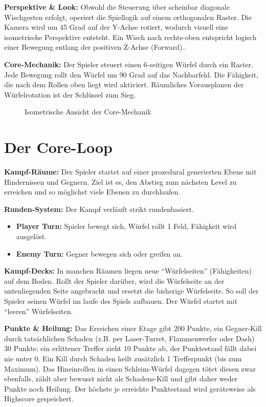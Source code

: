 \documentclass[oneside]{ausarbeitung}
\begin{document}
\textbf{Perspektive \& Look:} Obwohl die Steuerung über scheinbar diagonale Wischgesten erfolgt, operiert die Spiellogik auf einem orthogonalen Raster. Die Kamera wird um 45 Grad auf der Y-Achse rotiert, wodurch visuell eine isometrische Perspektive entsteht. Ein Wisch nach rechts-oben entspricht logisch einer Bewegung entlang der positiven Z-Achse (Forward)..

\textbf{Core-Mechanik:} Der Spieler steuert einen 6-seitigen Würfel durch ein Raster. Jede Bewegung rollt den Würfel um 90 Grad auf das Nachbarfeld. Die Fähigkeit, die nach dem Rollen oben liegt wird aktiviert. Räumliches Vorausplanen der Würfelrotation ist der Schlüssel zum Sieg.

\begin{figure}[h]
    \centering
    \caption{Isometrische Ansicht der Core-Mechanik}
    \label{fig:core-mechanik}
\end{figure}


\section{Der Core-Loop}
\textbf{Kampf-Räume:} Der Spieler startet auf einer prozedural generierten Ebene mit Hindernissen und Gegnern. Ziel ist es, den Abstieg zum nächsten Level zu erreichen und so möglichst viele Ebenen zu durchlaufen.

\textbf{Runden-System:} Der Kampf verläuft strikt rundenbasiert.
\begin{itemize}
    \item \textbf{Player Turn:} Spieler bewegt sich, Würfel rollt 1 Feld, Fähigkeit wird ausgelöst.
    \item \textbf{Enemy Turn:} Gegner bewegen sich oder greifen an.
\end{itemize}

\textbf{Kampf-Decks:} In manchen Räumen liegen neue \enquote{Würfelseiten} (Fähigkeiten) auf dem Boden. Rollt der Spieler darüber, wird die Würfelseite an der untenliegenden Seite angebracht und ersetzt die bisherige Würfelseite. So soll der Spieler seinen Würfel im laufe des Spiels aufbauen. Der Würfel startet mit \enquote{leeren} Würfelseiten.

\textbf{Punkte \& Heilung:} Das Erreichen einer Etage gibt 200 Punkte, ein Gegner-Kill durch tatsächlichen Schaden (z.B. per Laser-Turret, Flammenwerfer oder Dash) 30 Punkte; ein erlittener Treffer zieht 10 Punkte ab, der Punktestand fällt dabei nie unter 0. Ein Kill durch Schaden heilt zusätzlich 1 Trefferpunkt (bis zum Maximum). Das Hineinrollen in einen Schleim-Würfel dagegen tötet diesen zwar ebenfalls, zählt aber bewusst nicht als Schadens-Kill und gibt daher weder Punkte noch Heilung. Der höchste je erreichte Punktestand wird geräteweise als Highscore gespeichert.
\end{document}
